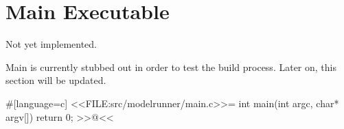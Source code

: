 \section{Main Executable}

Not yet implemented.

Main is currently stubbed out in order to test the build process. Later on, this
section will be updated.

#[language=c]
<<FILE:src/modelrunner/main.c>>=
int main(int argc, char* argv[])
{
    return 0;
}
>>@<<
